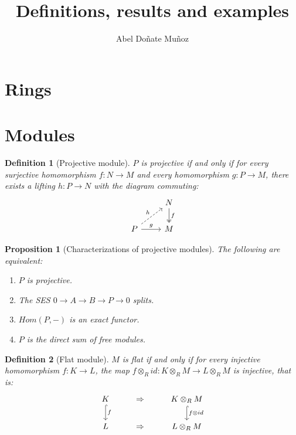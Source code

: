 \documentclass[leqno]{article}
\title{Definitions, results and examples}
\author{Abel Doñate Muñoz}
\date{}
\newtheorem{proposition}{Proposition}
\newtheorem{definition}{Definition}
\begin{document}
\maketitle
\tableofcontents
\newpage

\section{Rings}


\section{Modules}
\begin{definition}[Projective module] $P$ is projective if and only if for every surjective homomorphism $f:N\to M$ and every homomorphism $g:P\to M$, there exists a lifting $h:P\to N$ with the diagram commuting:
\[\begin{tikzcd}
	& N \\
	P & M
	\arrow["f", two heads, from=1-2, to=2-2]
	\arrow["g", from=2-1, to=2-2]
	\arrow["h", dashed, from=2-1, to=1-2]
\end{tikzcd}\]
\end{definition}

\begin{proposition}[Characterizations of projective modules] The following are equivalent:
\begin{enumerate}[topsep=-6pt, itemsep=0pt]
  \item $P$ is projective.
  \item The SES $0\to A \to B\to P\to 0$ splits.
  \item $Hom(P, -)$ is an exact functor.
  \item $P$ is the direct sum of free modules.
\end{enumerate}
\end{proposition}

\begin{definition}[Flat module] $M$ is flat if and only if for every injective homomorphism $f:K\to L$, the map $f \otimes _R id : K\otimes _{R} M \to L\otimes _R M$ is injective, that is:
\[\begin{tikzcd}
	K & \Rightarrow & {K\otimes_RM} \\
	L & \Rightarrow & {L\otimes _R M}
	\arrow["f", hook, from=1-1, to=2-1]
	\arrow["{f\otimes id}", hook, from=1-3, to=2-3]
\end{tikzcd}\]
\end{definition}
\end{document}

